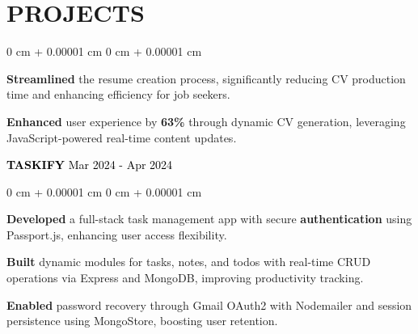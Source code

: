 \documentclass[10pt, letterpaper]{article}
\newenvironment{onecolentry}{    \begin{adjustwidth}{        0 cm + 0.00001 cm    }{        0 cm + 0.00001 cm    }}{    \end{adjustwidth}} %
\newenvironment{header}{    \setlength{\topsep}{0pt}\par\kern\topsep\centering\linespread{1.5}}{    \par\kern\topsep} %
\begin{document}
\begin{header}
    \section{PROJECTS}
\vspace{0.10 cm}

\vspace{0.10 cm}

\vspace{0.10 cm}
\begin{onecolentry}    \begin{highlights}        \item \textbf{Streamlined} the resume creation process, significantly reducing CV production time and enhancing efficiency for job seekers.        \item \textbf{Enhanced} user experience by \textbf{63\%} through dynamic CV generation, leveraging JavaScript-powered real-time content updates.           \end{highlights}\end{onecolentry}
\vspace{0.5 cm}
\noindent\textbf{\textcolor{black}{ TASKIFY}}   \hfill \textcolor{black}{Mar 2024 - Apr 2024} \\\vspace{0.10 cm}
\vspace{0.10 cm}
\begin{onecolentry}    \begin{highlights}        \item \textbf{Developed} a full-stack task management app with secure \textbf{authentication} using Passport.js, enhancing user access flexibility.         \item \textbf{Built} dynamic modules for tasks, notes, and todos with real-time CRUD operations via Express and MongoDB, improving productivity tracking.        \item \textbf{Enabled} password recovery through Gmail OAuth2 with Nodemailer and session persistence using MongoStore, boosting user retention.            \end{highlights}\end{onecolentry}


\end{header}
\end{document}
